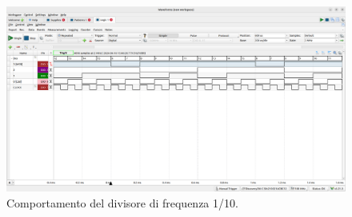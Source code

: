 \documentclass[10pt,a4paper]{article}
\begin{document}
\begin{figure}[htp]
\begin{center}
\includegraphics[scale=0.25]{fig5.png}
\caption{Comportamento del divisore di frequenza 1/10.}
\label{fig5}
\end{center}
\end{figure}
\end{document}
